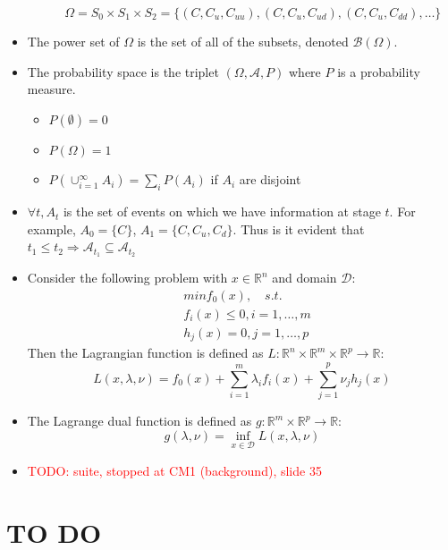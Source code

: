 \documentclass[12pt, openany]{report}
\newcommand{\R}{\mathbb{R}}
\newcommand{\A}{\mathcal{A}}
\theoremstyle{definition}
\begin{document}
\begin{itemize}
\begin{itemize}
		\begin{equation}
			\Omega = S_0 \times S_1 \times S_2 = \{(C, C_u, C_{uu}), (C, C_u, C_{ud}), (C, C_u, C_{dd}), \dots\}
		\end{equation}
	\end{itemize}
	\item The power set of $\Omega$ is the set of all of the subsets, denoted $\mathcal{B}(\Omega)$.
	\item The probability space is the triplet $(\Omega, \A, P)$ where $P$ is a probability measure.
	\begin{itemize}
		\item $P(\emptyset) = 0$
		\item $P(\Omega) = 1$
		\item $P(\cup_{i=1}^\infty A_i) = \sum_i P(A_i)$ if $A_i$ are disjoint
	\end{itemize} 
	\item $\forall t, A_t$ is the set of events on which we have information at stage $t$. For example, $A_0 = \{C\}$, $A_1 = \{C, C_u, C_d\}$. Thus is it evident that $ t_1 \leq t_2 \Rightarrow \A_{t_1} \subseteq \A_{t_2}$
	\item Consider the following problem with $x \in \R^n$ and domain $\mathcal{D}$:
	\begin{equation}
		\begin{aligned}
			&min f_0(x), \quad s.t.\\
			&f_i(x) \leq 0, i = 1, \dots, m\\
			&h_j(x) = 0, j = 1, \dots, p
		\end{aligned}
	\end{equation}
	Then the Lagrangian function is defined as $L: \R^n \times \R^m \times \R^p \to \R$:
	\begin{equation}
		L(x, \lambda, \nu) = f_0(x) + \sum_{i=1}^m \lambda_i f_i(x) + \sum_{j=1}^p \nu_j h_j(x)
	\end{equation}
	\item  The Lagrange dual function is defined as $g: \R^m \times \R^p \to \R$:
	\begin{equation}
		g(\lambda, \nu) = \inf_{x \in \mathcal{D}} L(x, \lambda, \nu)
	\end{equation}
	\item \textcolor{red}{TODO: suite, stopped at CM1 (background), slide 35}
\end{itemize}
\chapter{TO DO}
\end{document}
